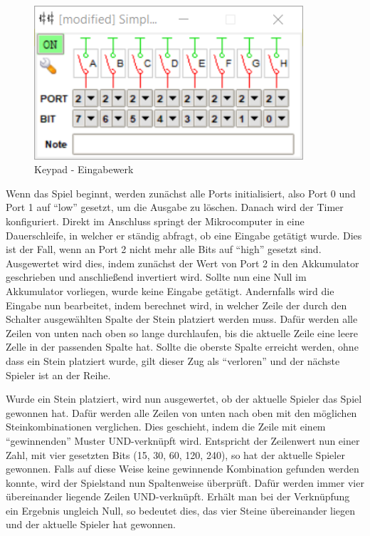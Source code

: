 \begin{figure}
	\centering
	\includegraphics[width=10cm]{keypad.png}
	\caption{Keypad - Eingabewerk}
	\label{img:grafik-keypad}
\end{figure}

Wenn das Spiel beginnt, werden zunächst alle Ports initialisiert, also Port 0 und Port 1 auf \enquote{low} gesetzt, um die Ausgabe zu löschen.
Danach wird der Timer konfiguriert.
Direkt im Anschluss springt der Mikrocomputer in eine Dauerschleife, in welcher er ständig abfragt, ob eine Eingabe getätigt wurde.
Dies ist der Fall, wenn an Port 2 nicht mehr alle Bits auf \enquote{high} gesetzt sind. 
Ausgewertet wird dies, indem zunächst der Wert von Port 2 in den Akkumulator geschrieben und anschließend invertiert wird. Sollte nun eine Null im Akkumulator vorliegen, wurde keine Eingabe getätigt.
Andernfalls wird die Eingabe nun bearbeitet, indem berechnet wird, in welcher Zeile der durch den Schalter ausgewählten Spalte der Stein platziert werden muss. Dafür werden alle Zeilen von unten nach oben so lange durchlaufen, bis die aktuelle Zeile eine leere Zelle in der passenden Spalte hat. Sollte die oberste Spalte erreicht werden, ohne dass ein Stein platziert wurde, gilt dieser Zug als \enquote{verloren} und der nächste Spieler ist an der Reihe.

Wurde ein Stein platziert, wird nun ausgewertet, ob der aktuelle Spieler das Spiel gewonnen hat. Dafür werden alle Zeilen von unten nach oben mit den möglichen Steinkombinationen verglichen. Dies geschieht, indem die Zeile mit einem \enquote{gewinnenden} Muster UND-verknüpft wird. Entspricht der Zeilenwert nun einer Zahl, mit vier gesetzten Bits (15, 30, 60, 120, 240), so hat der aktuelle Spieler gewonnen.
Falls auf diese Weise keine gewinnende Kombination gefunden werden konnte, wird der Spielstand nun Spaltenweise überprüft. Dafür werden immer vier übereinander liegende Zeilen UND-verknüpft. Erhält man bei der Verknüpfung ein Ergebnis ungleich Null, so bedeutet dies, das vier Steine übereinander liegen und der aktuelle Spieler hat gewonnen.

